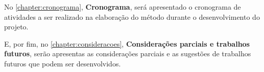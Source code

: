 \par
No \autoref{chapter:cronograma}, \textbf{Cronograma}, será apresentado o cronograma de atividades a ser realizado na elaboração do método durante o desenvolvimento do projeto.

\par

\par
E, por fim, no \autoref{chapter:consideracoes}, \textbf{Considerações parciais e trabalhos futuros}, serão apresentas as considerações parciais e as sugestões de trabalhos futuros que podem ser desenvolvidos. 
